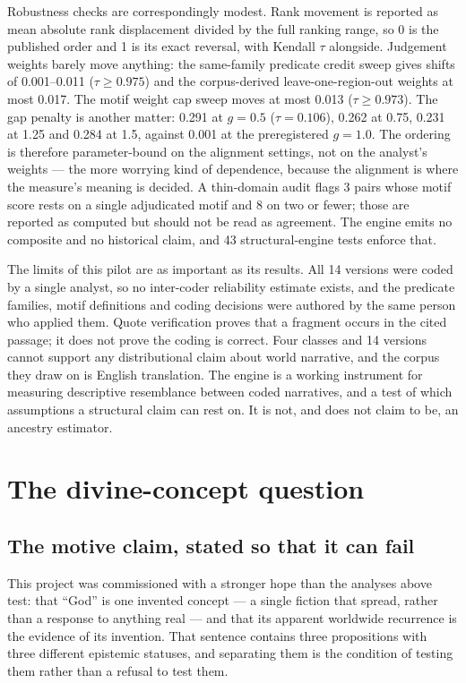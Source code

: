 \documentclass[11pt]{article}
\DeclareRobustCommand{\_}{\textunderscore\allowbreak}
\newcommand{\nocr}{no inter-coder reliability estimate exists}
\begin{document}
Robustness checks are correspondingly modest. Rank movement is reported as mean
absolute rank displacement divided by the full ranking range, so 0 is the
published order and 1 is its exact reversal, with Kendall \(\tau\) alongside.
Judgement weights barely move anything: the same-family predicate credit sweep
gives shifts of 0.001--0.011 (\(\tau \ge 0.975\)) and the corpus-derived
leave-one-region-out weights at most 0.017. The motif weight cap sweep moves at
most 0.013 (\(\tau \ge 0.973\)). The gap penalty is another matter: 0.291 at
\(g = 0.5\) (\(\tau = 0.106\)), 0.262 at 0.75, 0.231 at 1.25 and 0.284 at 1.5,
against 0.001 at the preregistered \(g = 1.0\). The ordering is therefore
parameter-bound on the alignment settings, not on the analyst's weights --- the
more worrying kind of dependence, because the alignment is where the measure's
meaning is decided. A thin-domain audit flags 3 pairs whose motif score rests on
a single adjudicated motif and 8 on two or fewer; those are reported as computed
but should not be read as agreement. The engine emits no composite and no
historical claim, and 43 structural-engine tests enforce that.

The limits of this pilot are as important as its results. All 14 versions were
coded by a single analyst, so \nocr, and the predicate families, motif
definitions and coding decisions were authored by the same person who applied
them. Quote verification proves that a fragment occurs in the cited passage; it
does not prove the coding is correct. Four classes and 14 versions cannot support
any distributional claim about world narrative, and the corpus they draw on is
English translation. The engine is a working instrument for measuring descriptive
resemblance between coded narratives, and a test of which assumptions a
structural claim can rest on. It is not, and does not claim to be, an ancestry
estimator.

\section{The divine-concept question}

\subsection{The motive claim, stated so that it can fail}
\label{sec:motive}

This project was commissioned with a stronger hope than the analyses above test:
that ``God'' is one invented concept --- a single fiction that spread, rather
than a response to anything real --- and that its apparent worldwide recurrence is
the evidence of its invention. That sentence contains three propositions with
three different epistemic statuses, and separating them is the condition of
testing them rather than a refusal to test them.
\end{document}
